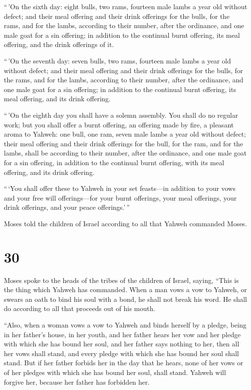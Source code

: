  ``\,'On the sixth day: eight bulls, two rams, fourteen
male lambs a year old without defect;  and their meal
offering and their drink offerings for the bulls, for the rams, and for
the lambs, according to their number, after the ordinance,
 and one male goat for a sin offering; in addition to the
continual burnt offering, its meal offering, and the drink offerings of
it.

 ``\,'On the seventh day: seven bulls, two rams, fourteen
male lambs a year old without defect;  and their meal
offering and their drink offerings for the bulls, for the rams, and for
the lambs, according to their number, after the ordinance,
 and one male goat for a sin offering; in addition to the
continual burnt offering, its meal offering, and its drink offering.

 ``\,'On the eighth day you shall have a solemn assembly.
You shall do no regular work;  but you shall offer a
burnt offering, an offering made by fire, a pleasant aroma to Yahweh:
one bull, one ram, seven male lambs a year old without defect;
 their meal offering and their drink offerings for the
bull, for the ram, and for the lambs, shall be according to their
number, after the ordinance,  and one male goat for a sin
offering, in addition to the continual burnt offering, with its meal
offering, and its drink offering.

 ``\,`You shall offer these to Yahweh in your set
feasts---in addition to your vows and your free will offerings---for
your burnt offerings, your meal offerings, your drink offerings, and
your peace offerings.'\,''

 Moses told the children of Israel according to all that
Yahweh commanded Moses.

\hypertarget{section-29}{%
\section{30}\label{section-29}}

 Moses spoke to the heads of the tribes of the children of
Israel, saying, ``This is the thing which Yahweh has commanded.
 When a man vows a vow to Yahweh, or swears an oath to
bind his soul with a bond, he shall not break his word. He shall do
according to all that proceeds out of his mouth.

 ``Also, when a woman vows a vow to Yahweh and binds
herself by a pledge, being in her father's house, in her youth,
 and her father hears her vow and her pledge with which
she has bound her soul, and her father says nothing to her, then all her
vows shall stand, and every pledge with which she has bound her soul
shall stand.  But if her father forbids her in the day
that he hears, none of her vows or of her pledges with which she has
bound her soul, shall stand. Yahweh will forgive her, because her father
has forbidden her.

